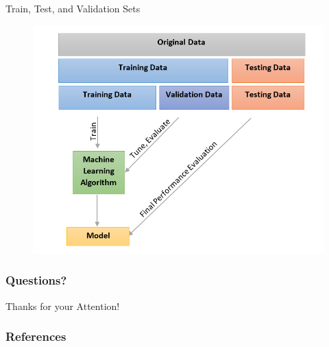 \documentclass[handout]{beamer}
\begin{document}
\begin{frame}{Train, Test, and Validation Sets}
\begin{scriptsize}

 \begin{figure}[htb]
	\centering
	 \includegraphics[scale=0.55]{pics/validation.png}
\end{figure}


\end{scriptsize}
\end{frame}








\begin{frame}
\frametitle{Questions?}
\begin{center}\LARGE Thanks for your Attention!\\ \end{center}



\end{frame}

\begin{frame}[allowframebreaks]\scriptsize
\frametitle{References}


%
\end{frame}  


\end{document}
